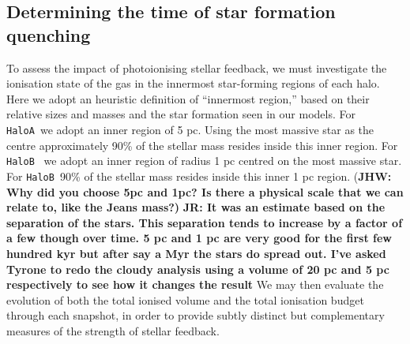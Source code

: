 \documentclass[graphics, twocolumn, usenatbib]{mn2e}
\newcommand{\ha} {\texttt{HaloA~}}
\newcommand{\hb} {\texttt{HaloB~}}
\def\jr#1{{\color{blue} \bf JR:  #1}}
\newcommand{\jhw}[1]{{\color{Maroon} (\bf JHW: #1)}}
\begin{document}

\subsection{Determining the time of star formation quenching}\label{cloudy:results}

To assess the impact of photoionising stellar feedback, we must investigate the ionisation state
of the gas in the innermost star-forming regions of each halo. Here we adopt an heuristic
definition of ``innermost region,'' based on their relative sizes and masses and the star
formation seen in our models. For \ha we adopt an inner region of 5 pc. Using the most massive
star as the centre approximately 90\% of the stellar mass resides inside this inner region. For \hb
we adopt an inner region of radius 1 pc centred on the most massive star. For \hb 90\% of the
stellar mass resides inside this inner 1 pc region.   
\jhw{Why did you choose 5pc and 1pc? Is there a physical scale that we can relate to, like the Jeans mass?} \jr{It was an estimate based on the separation of the stars. This separation tends to
  increase by a factor of a few though over time. 5 pc and 1 pc are very good for the first
  few hundred kyr but after say a Myr the stars do spread out. I've asked Tyrone to redo the
  cloudy analysis using a volume of 20 pc and 5 pc respectively to see how it changes the result}
We may then evaluate the evolution of both the total ionised volume and the total ionisation budget through each snapshot, in order to provide subtly distinct but complementary measures of the strength of stellar feedback.
\end{document}
